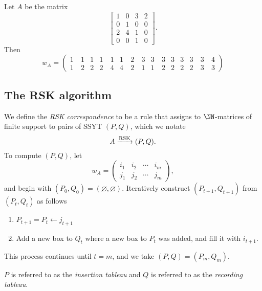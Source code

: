 \documentclass{article}
\newcommand{\rskarrow}{\ensuremath\xrightarrow{\text{RSK}}}
\begin{document}
\begin{example}
    Let $A$ be the matrix
    \[
        \begin{bmatrix}
            1 & 0 & 3 & 2 \\
            0 & 1 & 0 & 0 \\
            2 & 4 & 1 & 0 \\
            0 & 0 & 1 & 0
        \end{bmatrix}.
    \]
    Then 
    \[
        w_A = \begin{pmatrix}
            1 & 1 & 1 & 1 & 1 & 1 \
              & 2 \
              & 3 & 3 & 3 & 3 & 3 & 3 & 3\
              & 4 \\
            1 \
              & 2 & 2 & 2 \
              & 4 & 4 \
              & 2 \
              & 1 & 1 \
              & 2 & 2 & 2 & 2 \
              & 3 \
              & 3
        \end{pmatrix}
    \]
\end{example}

\subsection{The RSK algorithm}

\begin{definition}
    We define the \textit{RSK correspondence} to be a rule that assigns to $\NN$-matrices of finite support to pairs of SSYT $(P, Q)$, which we notate
    \[
        A \rskarrow (P, Q).
    \]
    To compute $(P, Q)$, let 
    \[
        w_A = \begin{pmatrix}
            i_1 & i_2 & \cdots & i_m \\
            j_1 & j_2 & \cdots & j_m
        \end{pmatrix},
    \]
    and begin with $(P_0, Q_0) = (\varnothing, \varnothing)$. Iteratively construct $(P_{t+1}, Q_{t+1})$ from $(P_t,Q_t)$ as follows
    \begin{enumerate}[label=(\alph*)]
        \item $P_{t+1} = P_t \leftarrow j_{t+1}$
        \item Add a new box to $Q_t$ where a new box to $P_t$ was added, and fill it with $i_{t+1}$.
    \end{enumerate}
    This process continues until $t=m$, and we take $(P, Q) = (P_m, Q_m)$.

    $P$ is referred to as the \textit{insertion tableau} and $Q$ is referred to as the \textit{recording tableau}.
\end{definition}
\end{document}
